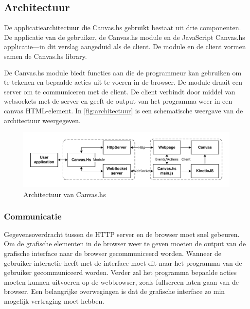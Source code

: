\subsection{Architectuur}
\label{subsec:architectuur}

De applicatiearchitectuur die Canvas.hs gebruikt bestaat uit drie componenten. De applicatie van de gebruiker, de Canvas.hs module en de JavaScript Canvas.hs applicatie—in dit verslag aangeduid als de client. De module en de client vormen samen de Canvas.hs library.

De Canvas.hs module biedt functies aan die de programmeur kan gebruiken om te tekenen en bepaalde acties uit te voeren in de browser. De module draait een server om te communiceren met de client. De client verbindt door middel van websockets met de server en geeft de output van het programma weer in een canvas HTML-element. In \autoref{fig:architectuur} is een schematische weergave van de architectuur weergegeven.

\begin{figure}
\begin{center}
\includegraphics[keepaspectratio,width=\textwidth]{./images/architecture.pdf}
\caption{Architectuur van Canvas.hs}
\label{fig:architectuur}
\end{center}
\end{figure}

\subsubsection{Communicatie}
Gegevensoverdracht tussen de HTTP server en de browser moet snel gebeuren. Om de grafische elementen in de browser weer te geven moeten de output van de grafische interface naar de browser gecommuniceerd worden. Wanneer de gebruiker interactie heeft met de interface moet dit naar het programma van de gebruiker gecommuniceerd worden. Verder zal het programma bepaalde acties moeten kunnen uitvoeren op de webbrowser, zoals fullscreen laten gaan van de browser. Een belangrijke overwegingen is dat de grafische interface zo min mogelijk vertraging moet hebben.



